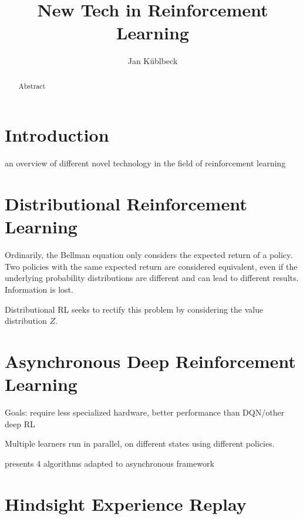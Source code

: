 \documentclass[runningheads]{llncs}
\begin{document}
%
\title{New Tech in Reinforcement Learning}
%
%
\author{Jan Küblbeck}
%
%
\institute{}
%
\maketitle              %
%
\begin{abstract}
Abstract
\end{abstract}
%
%
%
\section{Introduction}

an overview of different novel technology in the field of reinforcement learning

\section{Distributional Reinforcement Learning}

Ordinarily, the Bellman equation only considers the expected return of a policy. Two policies with the same expected return are considered equivalent, even if the underlying probability distributions are different and can lead to different results. Information is lost.

Distributional RL seeks to rectify this problem by considering the value distribution $Z$.\cite{bellemare2017distributional}

\section{Asynchronous Deep Reinforcement Learning}

Goals: require less specialized hardware, better performance than DQN/other deep RL

Multiple learners run in parallel, on different states using different policies.

\cite{mnih2016asynchronous} presents 4 algorithms adapted to asynchronous framework

\section{Hindsight Experience Replay}
\end{document}
